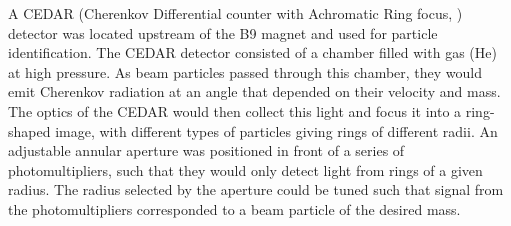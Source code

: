 A CEDAR (Cherenkov Differential counter with Achromatic Ring focus, \cite{CEDAR_note}) detector was located upstream of the B9 magnet and used for particle identification. The CEDAR detector consisted of a chamber filled with gas (He) at high pressure. As beam particles passed through this chamber, they would emit Cherenkov radiation at an angle that depended on their velocity and mass. The optics of the CEDAR would then collect this light and focus it into a ring-shaped image, with different types of particles giving rings of different radii. An adjustable annular aperture was positioned in front of a series of photomultipliers, such that they would only detect light from rings of a given radius. The radius selected by the aperture could be tuned such that signal from the photomultipliers corresponded to a beam particle of the desired mass.


%
%
%
%
%
%
%
%
%
%
%


